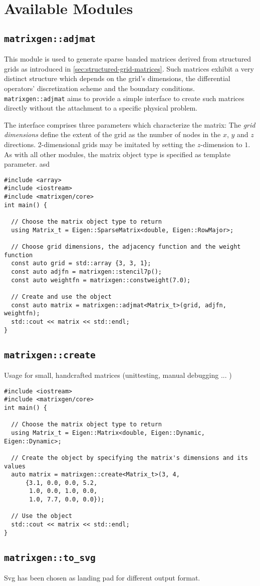 \chapter{Available Modules}

  \section{\texttt{matrixgen::adjmat}}

    This module is used to generate sparse banded matrices derived from structured grids as introduced in
    \ref{sec:structured-grid-matrices}. Such matrices exhibit a very distinct structure which depends on the grid's
    dimensions, the differential operators' discretization scheme and the boundary conditions.
    \texttt{matrixgen::adjmat} aims to provide a simple interface to create such matrices directly without the
    attachment to a specific physical problem.

    The interface comprises three parameters which characterize the matrix: The \emph{grid dimensions} define the extent
    of the grid as the number of nodes in the $x$, $y$ and $z$ directions. 2-dimensional grids may be imitated by
    setting the $z$-dimension to $1$. As with all other modules, the matrix object type is specified as template
    parameter. asd

    \begin{verbatim}
#include <array>
#include <iostream>
#include <matrixgen/core>
int main() {

  // Choose the matrix object type to return
  using Matrix_t = Eigen::SparseMatrix<double, Eigen::RowMajor>;

  // Choose grid dimensions, the adjacency function and the weight function
  const auto grid = std::array {3, 3, 1};
  const auto adjfn = matrixgen::stencil7p();
  const auto weightfn = matrixgen::constweight(7.0);

  // Create and use the object
  const auto matrix = matrixgen::adjmat<Matrix_t>(grid, adjfn, weightfn);
  std::cout << matrix << std::endl;
}
    \end{verbatim}

  \section{\texttt{matrixgen::create}}

    Usage for small, handcrafted matrices (unittesting, manual debugging ... )
    \begin{verbatim}
#include <iostream>
#include <matrixgen/core>
int main() {

  // Choose the matrix object type to return
  using Matrix_t = Eigen::Matrix<double, Eigen::Dynamic, Eigen::Dynamic>;

  // Create the object by specifying the matrix's dimensions and its values
  auto matrix = matrixgen::create<Matrix_t>(3, 4,
      {3.1, 0.0, 0.0, 5.2,
       1.0, 0.0, 1.0, 0.0,
       1.0, 7.7, 0.0, 0.0});

  // Use the object
  std::cout << matrix << std::endl;
}
    \end{verbatim}

  \section{\texttt{matrixgen::to\_svg}}

    Svg has been chosen as landing pad for different output format.

